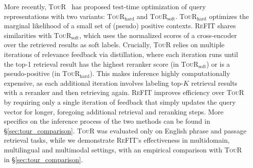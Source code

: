 More recently, \textsc{TouR}~\cite{sung2023optimizing} has proposed test-time optimization of query representations with two variants: \textsc{TouR}$_{\text{hard}}$ and  \textsc{TouR}$_{\text{soft}}$. 
\textsc{TouR}$_{\text{hard}}$ optimizes the marginal likelihood of a small set of (pseudo) positive contexts.
\textsc{ReFIT} shares similarities with \textsc{TouR}$_{\text{soft}}$, which uses the normalized scores of a cross-encoder over the retrieved results as soft labels.
Crucially, \textsc{TouR} relies on multiple iterations of relevance feedback via distillation, where each iteration runs until the top-1 retrieval result has the highest reranker score (in \textsc{TouR}$_{\text{soft}}$) or is a pseudo-positive (in \textsc{TouR}$_{\text{hard}}$).
This makes inference highly computationally expensive, as each additional iteration involves labeling top-$K$ retrieval results with a reranker and then retrieving again.
\textsc{ReFIT} improves efficiency over \textsc{TouR} by requiring only a single iteration of feedback that simply updates the query vector for longer, foregoing additional retrieval and reranking steps. More specifics on the inference process of the two methods can be found in \S{\ref{sec:tour_comparison}}.
\textsc{TouR} was evaluated only on English phrase and passage retrieval tasks, while we demonstrate \textsc{ReFIT}'s effectiveness in multidomain, multilingual and multimodal settings, with an empirical comparison with \textsc{TouR} in \S{\ref{sec:tour_comparison}}.